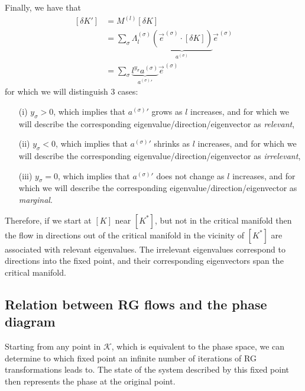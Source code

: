\documentclass[class=report, float=false, crop=false]{standalone}
\begin{document}
Finally, we have that
\begin{equation}
\begin{aligned}
[\delta K'] &= M^{(l)} [\delta K]\\
&= \sum_{\sigma} \Lambda^{(\sigma)}_l \underbrace{\left(\vec{e}^{\hspace{1pt}(\sigma)}\cdot[\delta K]\right)}_{a^{(\sigma)}} \vec{e}^{\hspace{1pt}(\sigma)}\\
&= \sum_{\sigma} \underbrace{l^{y_{\sigma}}a^{(\sigma)}}_{\textstyle a^{(\sigma)}\prime} \vec{e}^{\hspace{1pt}(\sigma)}
\end{aligned}
\end{equation}
for which we will distinguish 3 cases:
\begin{itemize}
\item[(i)] $y_{\sigma} > 0$, which implies that $a^{(\sigma)}\prime$ grows as $l$ increases, and for which we will describe the corresponding eigenvalue/direction/eigenvector as \textit{relevant},
\item[(ii)] $y_{\sigma} < 0$, which implies that $a^{(\sigma)}\prime$ shrinks as $l$ increases, and for which we will describe the corresponding eigenvalue/direction/eigenvector as \textit{irrelevant},
\item[(iii)] $y_{\sigma} = 0$, which implies that $a^{(\sigma)}\prime$ does not change as $l$ increases, and for which we will describe the corresponding eigenvalue/direction/eigenvector as \textit{marginal}.
\end{itemize}
Therefore, if we start at $[K]$ near $[K^*]$, but not in the critical manifold then the flow in directions out of the critical manifold in the vicinity of $[K^*]$ are associated with relevant eigenvalues. The irrelevant eigenvalues correspond to directions into the fixed point, and their corresponding eigenvectors span the critical manifold.

\subsection{Relation between RG flows and the phase diagram}

Starting from any point in $\mathcal{K}$, which is equivalent to the phase space, we can determine to which fixed point an infinite number of iterations of RG transformations leads to. The state of the system described by this fixed point then represents the phase at the original point.\\
\end{document}
